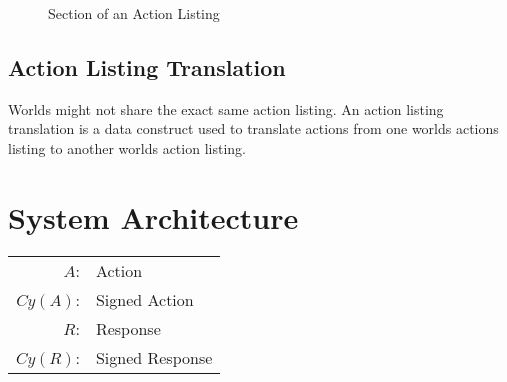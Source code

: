\documentclass[runningheads,a4paper]{llncs}
\begin{document}
\begin{figure}
\caption{Section of an Action Listing}
\label{CodeAL}

\end{figure}

\subsection{Action Listing Translation}
Worlds might not share the exact same action listing. An action listing translation is a data construct used to translate actions from one worlds actions listing to another worlds action listing.

\section{System Architecture}
\begin{center}
\begin{tabular}{r l}
$A$: & Action\\ 
$Cy(A)$: & Signed Action\\
$R$: & Response\\ 
$Cy(R)$: & Signed Response\\

\end{tabular}
\end{center}
\end{document}
